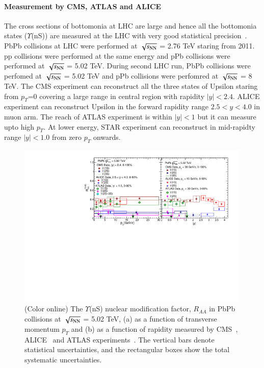 \paragraph{Measurement by CMS, ATLAS and ALICE}
 The cross sections of bottomonia at LHC are large and hence all the 
bottomonia states ($\Upsilon$(nS)) are measured at the LHC with very good statistical
precision~\cite{Chatrchyan:2011pe,Chatrchyan:2012lxa,Abelev:2014nua,Khachatryan:2016xxp}.
 PbPb collisions at LHC were performed at $\sqrt{s_{\rm NN}}$ = 2.76 TeV staring from 
2011. pp collisions were performed at the same energy and pPb collisions were performed
at $\sqrt{s_{\rm NN}}$ = 5.02 TeV. 
During second LHC run, PbPb collisions were perfomed at $\sqrt{s_{\rm NN}}$ = 5.02 TeV 
and pPb collisions were perfomred at $\sqrt{s_{\rm NN}}$ = 8 TeV. 
The CMS experiment can reconstruct all the three states of Upsilon staring from
$p_T$=0 covering a large range in central region with rapidity $|y| < 2.4$.
ALICE experiment can reconstruct Upsilon in the forward rapidity range
$2.5 < y < 4.0$ in muon arm.
The reach of ATLAS experiment is within $|y| < 1$ but it can measure upto high $p_T$.
At lower energy, STAR experiment can reconstruct in mid-rapidty range
$|y| < 1.0$ from zero $p_T$ onwards. 

\begin{figure}
  \includegraphics[width=0.99\textwidth]{Figures/ExpOverview/Fig_LHC_YnSRAAPtRap.pdf}
  \caption{(Color online) The $\Upsilon$(nS) nuclear modification factor, $R_{AA}$
in PbPb collisions at $\sqrt{s_{\rm NN}}$ = 5.02 TeV, (a) as a function of transverse momentum $p_{T}$
    and (b) as a function of rapidity measured by CMS~\cite{CMS:2018zza}, ALICE~\cite{ALICE:2020wwx}
    and ATLAS experiments~\cite{ALICE:2020wwx}.
    The vertical bars denote statistical uncertainties, and the rectangular boxes
    show the total systematic uncertainties.
  }
  \label{fig:LHCYnSRAAPtRap}
\end{figure}


